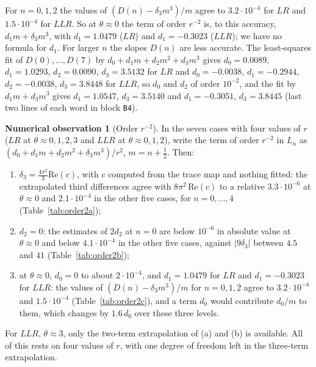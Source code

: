 \documentclass[11pt]{amsart}
\theoremstyle{definition}
\newtheorem{observation}[conjecture]{Numerical observation}
\theoremstyle{remark}
\begin{document}
For $n = 0, 1, 2$ the values of $(D(n) - \delta_3m^3)/m$ agree to $3.2\cdot10^{-4}$
for $LR$ and $1.5\cdot10^{-4}$ for $LLR$. So at $\theta \approx 0$ the term of order
$r^{-2}$ is, to this accuracy, $d_1m + \delta_3m^3$, with $d_1 = 1.0479$ ($LR$) and
$d_1 = -0.3023$ ($LLR$); we have no formula for $d_1$. For larger $n$ the slopes $D(n)$
are less accurate. The least-squares fit of $D(0), \dots, D(7)$ by
$d_0 + d_1m + d_2m^2 + d_3m^3$ gives $d_0 = 0.0089$, $d_1 = 1.0293$, $d_2 = 0.0090$,
$d_3 = 3.5132$ for $LR$ and $d_0 = -0.0038$, $d_1 = -0.2944$, $d_2 = -0.0038$,
$d_3 = 3.8448$ for $LLR$, so $d_0$ and $d_2$ of order $10^{-2}$, and the fit by
$d_1m + d_3m^3$ gives $d_1 = 1.0547$, $d_3 = 3.5140$ and $d_1 = -0.3051$,
$d_3 = 3.8445$ (last two lines of each word in block \texttt{B4}).

\begin{observation}[Order $r^{-2}$]\label{obs:cubic}
In the seven cases with four values of $r$ ($LR$ at $\theta \approx 0, 1, 2, 3$ and
$LLR$ at $\theta \approx 0, 1, 2$), write the term of order $r^{-2}$ in $L_n$ as
$(d_0 + d_1m + d_2m^2 + \delta_3m^3)/r^2$, $m = n + \frac12$. Then:
\begin{enumerate}
\item[(a)] $\delta_3 = \frac{4\pi^2}{3}\mathrm{Re}(c)$, with $c$ computed from the
trace map and nothing fitted: the extrapolated third differences agree with
$8\pi^2\,\mathrm{Re}(c)$ to a relative $3.3\cdot10^{-6}$ at $\theta \approx 0$ and
$2.1\cdot10^{-4}$ in the other five cases, for $n = 0, \dots, 4$
(Table~\ref{tab:order2a});
\item[(b)] $d_2 = 0$: the estimates of $2d_2$ at $n = 0$ are below $10^{-6}$ in
absolute value at $\theta \approx 0$ and below $4.1\cdot10^{-4}$ in the other five
cases, against $|9\delta_3|$ between $4.5$ and $41$ (Table~\ref{tab:order2b});
\item[(c)] at $\theta \approx 0$, $d_0 = 0$ to about $2\cdot10^{-4}$, and
$d_1 = 1.0479$ for $LR$ and $d_1 = -0.3023$ for $LLR$: the values of
$(D(n) - \delta_3m^3)/m$ for $n = 0, 1, 2$ agree to $3.2\cdot10^{-4}$ and
$1.5\cdot10^{-4}$ (Table~\ref{tab:order2c}), and a term $d_0$ would contribute
$d_0/m$ to them, which changes by $1.6\,d_0$ over these three levels.
\end{enumerate}
For $LLR$, $\theta \approx 3$, only the two-term extrapolation of (a) and (b) is
available. All of this rests on four values of $r$, with one degree of freedom left
in the three-term extrapolation.
\end{observation}
\end{document}

